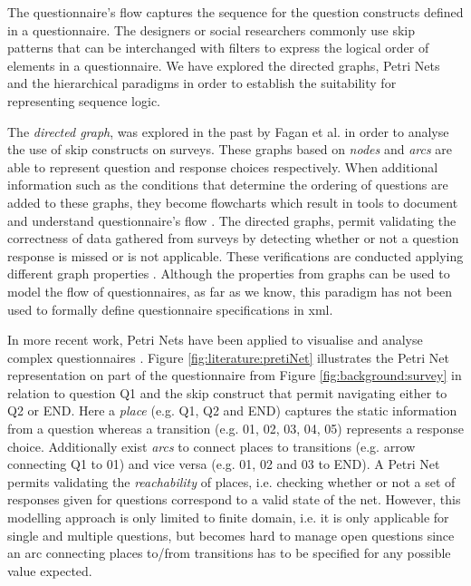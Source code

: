 	The questionnaire's flow captures the sequence for the question constructs defined in a questionnaire. The designers or social researchers commonly use skip patterns that can be interchanged with filters to express the logical order of elements in a questionnaire. We have explored the directed graphs, Petri Nets and the hierarchical paradigms in order to %
	establish the suitability for representing sequence logic.

	The \emph{directed graph}, was explored in the past by Fagan et al. in order to analyse the use of skip constructs on surveys. These graphs based on \emph{nodes} and \emph{arcs} are able to represent question and response choices respectively. %
	When additional information such as the conditions that determine the ordering of questions are added to these graphs, they become flowcharts which result in tools to document and understand questionnaire's flow \cite{art:jabine85}. The directed graphs, permit validating the correctness of data gathered from surveys by detecting whether or not a question response is missed or is not applicable. These verifications are conducted applying different graph properties \cite{tech:fagan88}. Although the properties from graphs can be used to model the flow of questionnaires, as far as we know, this paradigm has not been used to formally define questionnaire specifications in \gls{xml}.

	In more recent work, Petri Nets have been applied to visualise and analyse complex questionnaires \cite{proc:rolke10}. Figure \ref{fig:literature:pretiNet} illustrates the Petri Net representation on part of the questionnaire from Figure \ref{fig:background:survey} in relation to question Q1 and the skip construct that permit navigating either to Q2 or END. %
	Here a \emph{place} (e.g. Q1, Q2 and END) captures the static information from a question whereas a transition (e.g. 01, 02, 03, 04, 05) represents a response choice. Additionally exist \emph{arcs} to connect places to transitions (e.g. arrow connecting Q1 to 01) and vice versa (e.g. 01, 02 and 03 to END). A Petri Net permits validating the \emph{reachability} of places, i.e. checking whether or not a set of responses given for questions correspond to a valid state of the net. However, this modelling approach is only limited to finite domain, i.e. it is only applicable for single and multiple questions, but becomes hard to manage open questions since an arc connecting places to/from transitions has to be specified for any possible value expected.

